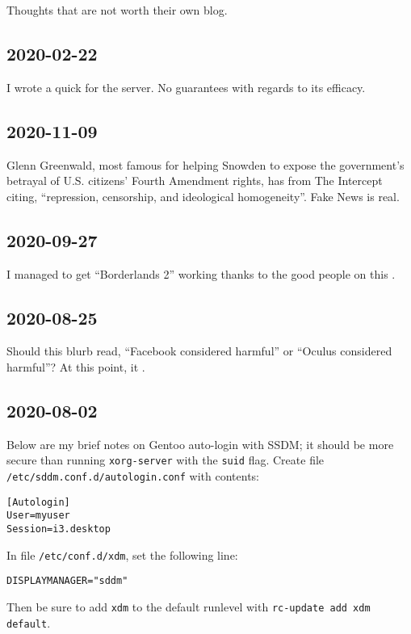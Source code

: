 \documentclass{article}
\begin{document}
Thoughts that are not worth their own blog.

\subsection{2020-02-22}
I wrote a quick  for the  server.  No guarantees with regards to its efficacy.

\subsection{2020-11-09}
Glenn Greenwald, most famous for helping Snowden to expose the government's betrayal of U.S. citizens' Fourth Amendment rights, has  from The Intercept citing, ``repression, censorship, and ideological homogeneity''.  Fake News is real.

\subsection{2020-09-27}
I managed to get ``Borderlands 2'' working thanks to the good people on this .

\subsection{2020-08-25}
Should this blurb read, ``Facebook considered harmful'' or ``Oculus considered harmful''?  At this point, it .

\subsection{2020-08-02}
Below are my brief notes on Gentoo auto-login with SSDM; it should be more secure than running \texttt{xorg-server} with the \texttt{suid} flag.  Create file \texttt{/etc/sddm.conf.d/autologin.conf} with contents:
\begin{verbatim}
[Autologin]
User=myuser
Session=i3.desktop
\end{verbatim}
In file \texttt{/etc/conf.d/xdm}, set the following line:
\begin{verbatim}
DISPLAYMANAGER="sddm"
\end{verbatim}
Then be sure to add \texttt{xdm} to the default runlevel with \texttt{rc-update add xdm default}.
\end{document}

